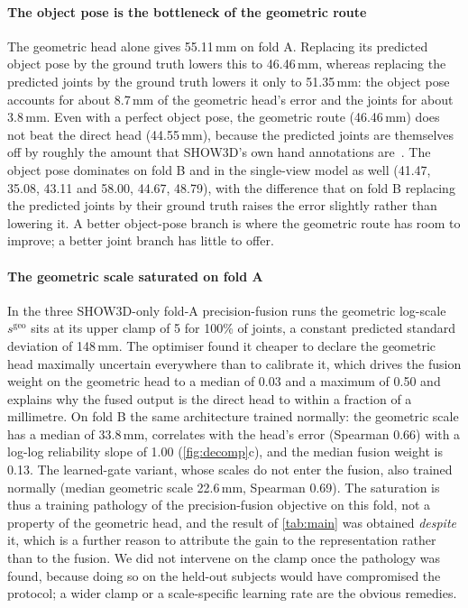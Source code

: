 \paragraph{The object pose is the bottleneck of the geometric route}
The geometric head alone gives 55.11\,mm on fold A. Replacing its predicted object pose by the ground truth lowers this to 46.46\,mm, whereas replacing the predicted joints by the ground truth lowers it only to 51.35\,mm: the object pose accounts for about 8.7\,mm of the geometric head's error and the joints for about 3.8\,mm. Even with a perfect object pose, the geometric route (46.46\,mm) does not beat the direct head (44.55\,mm), because the predicted joints are themselves off by roughly the amount that SHOW3D's own hand annotations are~\cite{rim2026show3d}. The object pose dominates on fold B and in the single-view model as well (41.47, 35.08, 43.11 and 58.00, 44.67, 48.79), with the difference that on fold B replacing the predicted joints by their ground truth raises the error slightly rather than lowering it. A better object-pose branch is where the geometric route has room to improve; a better joint branch has little to offer.

\paragraph{The geometric scale saturated on fold A}
In the three SHOW3D-only fold-A precision-fusion runs the geometric log-scale $s^{\text{geo}}$ sits at its upper clamp of 5 for 100\% of joints, a constant predicted standard deviation of 148\,mm. The optimiser found it cheaper to declare the geometric head maximally uncertain everywhere than to calibrate it, which drives the fusion weight on the geometric head to a median of 0.03 and a maximum of 0.50 and explains why the fused output is the direct head to within a fraction of a millimetre. On fold B the same architecture trained normally: the geometric scale has a median of 33.8\,mm, correlates with the head's error (Spearman 0.66) with a log-log reliability slope of 1.00 (\cref{fig:decomp}c), and the median fusion weight is 0.13. The learned-gate variant, whose scales do not enter the fusion, also trained normally (median geometric scale 22.6\,mm, Spearman 0.69). The saturation is thus a training pathology of the precision-fusion objective on this fold, not a property of the geometric head, and the result of \cref{tab:main} was obtained \emph{despite} it, which is a further reason to attribute the gain to the representation rather than to the fusion. We did not intervene on the clamp once the pathology was found, because doing so on the held-out subjects would have compromised the protocol; a wider clamp or a scale-specific learning rate are the obvious remedies.

